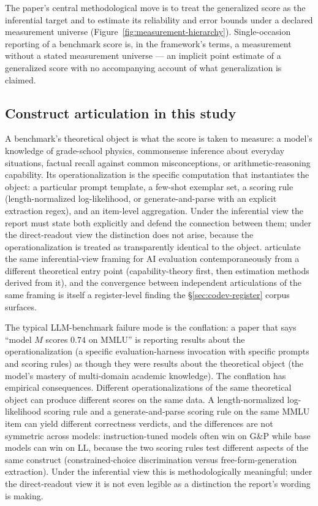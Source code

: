 \documentclass[11pt]{article}
\begin{document}
The paper's central methodological move is to treat the generalized score as the inferential target and to estimate its reliability and error bounds under a declared measurement universe (Figure~\ref{fig:measurement-hierarchy}). Single-occasion reporting of a benchmark score is, in the framework's terms, a measurement without a stated measurement universe --- an implicit point estimate of a generalized score with no accompanying account of what generalization is claimed.

\subsection{Construct articulation in this study}
\label{sec:construct-articulation}


A benchmark's theoretical object is what the score is taken to
measure: a model's knowledge of grade-school physics, commonsense
inference about everyday situations, factual recall against common
misconceptions, or arithmetic-reasoning capability. Its
operationalization is the specific computation that instantiates
the object: a particular prompt template, a few-shot exemplar set,
a scoring rule (length-normalized log-likelihood, or generate-and-parse
with an explicit extraction regex), and an item-level aggregation.
Under the inferential view the report must state both explicitly
and defend the connection between them; under the direct-readout
view the distinction does not arise, because the operationalization
is treated as transparently identical to the object.
\citet{jo2025evalinference} articulate the same inferential-view
framing for AI evaluation contemporaneously from a different
theoretical entry point (capability-theory first, then estimation
methods derived from it), and the convergence between independent
articulations of the same framing is itself a register-level
finding the §\ref{sec:codev-register} corpus surfaces.

The typical LLM-benchmark failure mode is the conflation: a paper
that says ``model $M$ scores $0.74$ on MMLU'' is reporting results
about the operationalization (a specific evaluation-harness
invocation with specific prompts and scoring rules) as though they
were results about the theoretical object (the model's mastery of
multi-domain academic knowledge). The conflation has empirical
consequences. Different operationalizations of the same theoretical
object can produce different scores on the same data. A
length-normalized log-likelihood scoring rule and a
generate-and-parse scoring rule on the same MMLU item can yield
different correctness verdicts, and the differences are not
symmetric across models: instruction-tuned models often win on G\&P
while base models can win on LL, because the two scoring rules test
different aspects of the same construct (constrained-choice
discrimination versus free-form-generation extraction). Under the
inferential view this is methodologically meaningful; under the
direct-readout view it is not even legible as a distinction the
report's wording is making.
\end{document}
